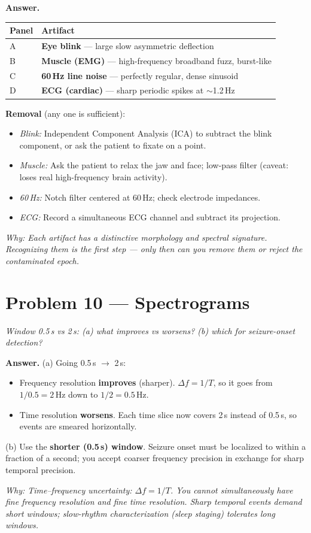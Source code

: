 \documentclass[11pt,letterpaper]{article}
\newcommand{\answer}[1]{%
\begin{tcolorbox}[colback=ansbg,colframe=accent!60,boxrule=0.4pt,arc=3pt,
  left=8pt,right=8pt,top=5pt,bottom=5pt]
\textbf{Answer.} #1
\end{tcolorbox}}
\newcommand{\why}[1]{\par\vspace{0.2em}\textit{Why: #1}}
\begin{document}
\answer{
\begin{tabular}{ll}
\textbf{Panel} & \textbf{Artifact} \\
\hline
\rule{0pt}{1.1em} A & \textbf{Eye blink} --- large slow asymmetric deflection \\
B & \textbf{Muscle (EMG)} --- high-frequency broadband fuzz, burst-like \\
C & \textbf{60\,Hz line noise} --- perfectly regular, dense sinusoid \\
D & \textbf{ECG (cardiac)} --- sharp periodic spikes at $\sim$1.2\,Hz \\
\hline
\end{tabular}

\vspace{0.5em}
\textbf{Removal} (any one is sufficient):
\begin{itemize}[leftmargin=*,nosep]
\item \textit{Blink:} Independent Component Analysis (ICA) to subtract the blink component, or ask the patient to fixate on a point.
\item \textit{Muscle:} Ask the patient to relax the jaw and face; low-pass filter (caveat: loses real high-frequency brain activity).
\item \textit{60\,Hz:} Notch filter centered at 60\,Hz; check electrode impedances.
\item \textit{ECG:} Record a simultaneous ECG channel and subtract its projection.
\end{itemize}}
\why{Each artifact has a distinctive morphology and spectral signature. Recognizing them is the first step --- only then can you remove them or reject the contaminated epoch.}

\section*{Problem 10 — Spectrograms}
\textit{Window 0.5\,s vs 2\,s: (a) what improves vs worsens? (b) which for seizure-onset detection?}

\answer{(a) Going 0.5\,s $\to$ 2\,s:
\begin{itemize}[leftmargin=*,nosep]
\item Frequency resolution \textbf{improves} (sharper). $\Delta f = 1/T$, so it goes from $1/0.5 = 2$\,Hz down to $1/2 = 0.5$\,Hz.
\item Time resolution \textbf{worsens}. Each time slice now covers 2\,s instead of 0.5\,s, so events are smeared horizontally.
\end{itemize}
(b) Use the \textbf{shorter (0.5\,s) window}. Seizure onset must be localized to within a fraction of a second; you accept coarser frequency precision in exchange for sharp temporal precision.}
\why{Time--frequency uncertainty: $\Delta f = 1/T$. You cannot simultaneously have fine frequency resolution and fine time resolution. Sharp temporal events demand short windows; slow-rhythm characterization (sleep staging) tolerates long windows.}
\end{document}
